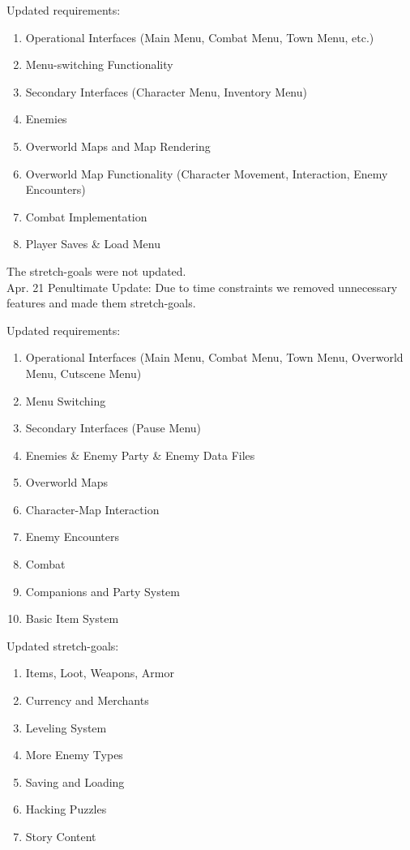 \documentclass[10pt,conference,onecolumn,compsoc]{IEEEtran}
\begin{document}
Updated requirements:
\begin{enumerate}
\item Operational Interfaces (Main Menu, Combat Menu, Town Menu, etc.)
\item Menu-switching Functionality
\item Secondary Interfaces (Character Menu, Inventory Menu)
\item Enemies
\item Overworld Maps and Map Rendering
\item Overworld Map Functionality (Character Movement, Interaction, Enemy Encounters)
\item Combat Implementation
\item Player Saves \& Load Menu
\end{enumerate}

The stretch-goals were not updated.\\

Apr. 21 Penultimate Update: 
Due to time constraints we removed unnecessary features and made them stretch-goals.

Updated requirements:
\begin{enumerate}
\item Operational Interfaces (Main Menu, Combat Menu, Town Menu, Overworld Menu, Cutscene Menu)
\item Menu Switching
\item Secondary Interfaces (Pause Menu)
\item Enemies \& Enemy Party \& Enemy Data Files
\item Overworld Maps
\item Character-Map Interaction
\item Enemy Encounters
\item Combat
\item Companions and Party System
\item Basic Item System
\end{enumerate}

Updated stretch-goals:
\begin{enumerate}
\item Items, Loot, Weapons, Armor
\item Currency and Merchants
\item Leveling System
\item More Enemy Types
\item Saving and Loading
\item Hacking Puzzles
\item Story Content\\
\end{enumerate}
\end{document}
